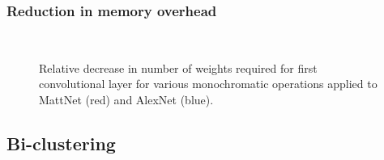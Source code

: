 \subsubsection{Reduction in memory overhead}
\begin{figure}[t]
\mbox{
}
\label{monochromatic_numweights}
\caption{Relative decrease in number of weights required for first convolutional layer for various monochromatic operations applied to MattNet (red) and AlexNet (blue).}
\end{figure}

\subsection{Bi-clustering}

